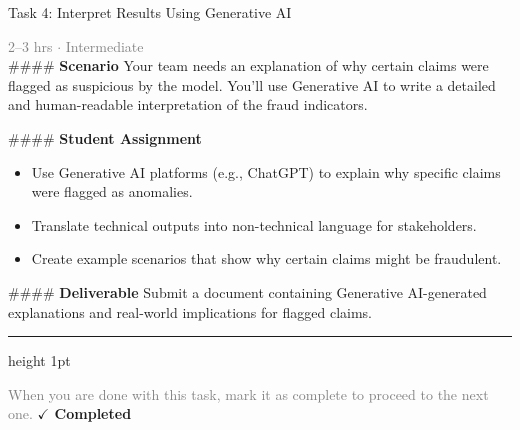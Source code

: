 \documentclass[10pt,a4paper]{article}
\begin{document}
\begin{taskbox}{Task 4: Interpret Results Using Generative AI}

    {\small \textcolor{gray}{2--3 hrs $\cdot$ Intermediate}}\\[12pt]

    \#\#\#\# \textbf{Scenario}  
Your team needs an explanation of why certain claims were flagged as suspicious by the model. You’ll use Generative AI to write a detailed and human-readable interpretation of the fraud indicators.  

\#\#\#\# \textbf{Student Assignment}  
\begin{itemize}
    \item Use Generative AI platforms (e.g., ChatGPT) to explain why specific claims were flagged as anomalies.  
    \item Translate technical outputs into non-technical language for stakeholders.  
    \item Create example scenarios that show why certain claims might be fraudulent.  
\end{itemize}

\#\#\#\# \textbf{Deliverable}  
Submit a document containing Generative AI-generated explanations and real-world implications for flagged claims.\par

    \vspace{16pt}

    \textcolor{cardBorder}{\hrule height 1pt}\vspace{8pt}

    \small \textcolor{gray}{When you are done with this task, mark it as complete to proceed to the next one.} \hfill \textbf{\textcolor{brandDark}{$\checkmark$ Completed}}

\end{taskbox}
\end{document}

